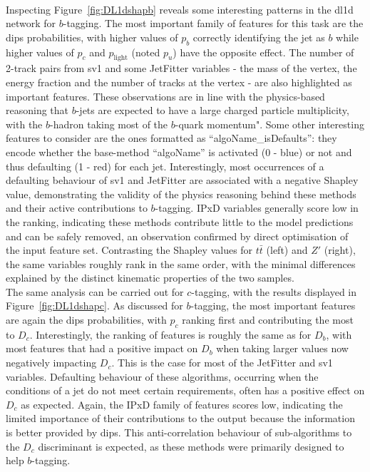 \paragraph{}Inspecting Figure~\ref{fig:DL1dshapb} reveals some interesting patterns in the \gls{dl1d} network for $b$-tagging. The most important family of features for this task are the \gls{dips} probabilities, with higher values of $p_b$ correctly identifying the jet as $b$ while higher values of $p_c$ and $p_{\textrm{light}}$ (noted $p_u$) have the opposite effect. The number of 2-track pairs from \gls{sv1} and some JetFitter variables - the mass of the vertex, the energy fraction and the number of tracks at the vertex - are also highlighted as important features. These observations are in line with the physics-based reasoning that $b$-jets are expected to have a large charged particle multiplicity, with the $b$-hadron taking most of the $b$-quark momentum". Some other interesting features to consider are the ones formatted as  ``algoName\_isDefaults'': they encode whether the base-method ``algoName'' is activated (0 - blue) or not and thus defaulting (1 - red) for each jet. Interestingly, most occurrences of a defaulting behaviour of \gls{sv1} and JetFitter are associated with a negative Shapley value, demonstrating the validity of the physics reasoning behind these methods and their active contributions to $b$-tagging. IPxD variables generally score low in the ranking, indicating these methods contribute little to the model predictions and can be safely removed, an observation confirmed by direct optimisation of the input feature set. Contrasting the Shapley values for $t\bar{t}$ (left) and $Z'$ (right), the same variables roughly rank in the same order, with the minimal differences explained by the distinct kinematic properties of the two samples. \\

The same analysis can be carried out for $c$-tagging, with the results displayed in Figure~\ref{fig:DL1dshapc}. As discussed for $b$-tagging, the most important features are again the \gls{dips} probabilities, with $p_c$ ranking first and contributing the most to $D_c$. Interestingly, the ranking of features is roughly the same as for $D_b$, with most features that had a positive impact on $D_b$ when taking larger values now negatively impacting $D_c$. This is the case for most of the JetFitter and \gls{sv1} variables. Defaulting behaviour of these algorithms, occurring when the conditions of a jet do not meet certain requirements, often has a positive effect on $D_c$ as expected. Again, the IPxD family of features scores low, indicating the limited importance of their contributions to the output because the information is better provided by \gls{dips}. This anti-correlation behaviour of sub-algorithms to the $D_c$ discriminant is expected, as these methods were primarily designed to help $b$-tagging. 

